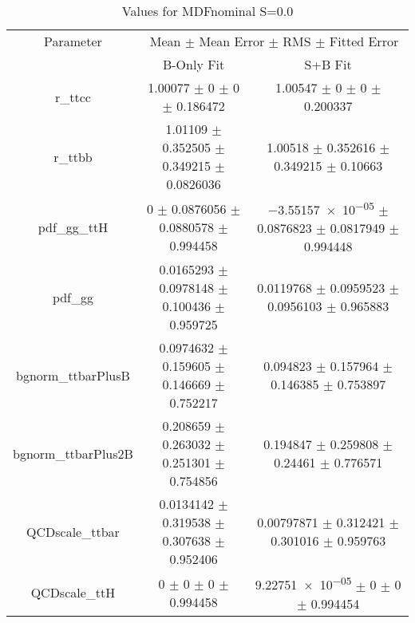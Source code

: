 \begin{table}
\centering
\caption{Values for MDFnominal S=0.0}
\begin{tabular}{ccc}
\toprule
Parameter & \multicolumn{2}{c}{Mean $\pm$ Mean Error $\pm$ RMS $\pm$ Fitted Error}\\
 & B-Only Fit & S+B Fit\\
\midrule
r\_ttcc & \num{1.00077} $\pm$ \num{0} $\pm$ \num{0} $\pm$ \num{0.186472} & \num{1.00547} $\pm$ \num{0} $\pm$ \num{0} $\pm$ \num{0.200337}\\
r\_ttbb & \num{1.01109} $\pm$ \num{0.352505} $\pm$ \num{0.349215} $\pm$ \num{0.0826036} & \num{1.00518} $\pm$ \num{0.352616} $\pm$ \num{0.349215} $\pm$ \num{0.10663}\\
pdf\_gg\_ttH & \num{0} $\pm$ \num{0.0876056} $\pm$ \num{0.0880578} $\pm$ \num{0.994458} & \num{-3.55157e-05} $\pm$ \num{0.0876823} $\pm$ \num{0.0817949} $\pm$ \num{0.994448}\\
pdf\_gg & \num{0.0165293} $\pm$ \num{0.0978148} $\pm$ \num{0.100436} $\pm$ \num{0.959725} & \num{0.0119768} $\pm$ \num{0.0959523} $\pm$ \num{0.0956103} $\pm$ \num{0.965883}\\
bgnorm\_ttbarPlusB & \num{0.0974632} $\pm$ \num{0.159605} $\pm$ \num{0.146669} $\pm$ \num{0.752217} & \num{0.094823} $\pm$ \num{0.157964} $\pm$ \num{0.146385} $\pm$ \num{0.753897}\\
bgnorm\_ttbarPlus2B & \num{0.208659} $\pm$ \num{0.263032} $\pm$ \num{0.251301} $\pm$ \num{0.754856} & \num{0.194847} $\pm$ \num{0.259808} $\pm$ \num{0.24461} $\pm$ \num{0.776571}\\
QCDscale\_ttbar & \num{0.0134142} $\pm$ \num{0.319538} $\pm$ \num{0.307638} $\pm$ \num{0.952406} & \num{0.00797871} $\pm$ \num{0.312421} $\pm$ \num{0.301016} $\pm$ \num{0.959763}\\
QCDscale\_ttH & \num{0} $\pm$ \num{0} $\pm$ \num{0} $\pm$ \num{0.994458} & \num{9.22751e-05} $\pm$ \num{0} $\pm$ \num{0} $\pm$ \num{0.994454}\\
\bottomrule
\end{tabular}
\end{table}